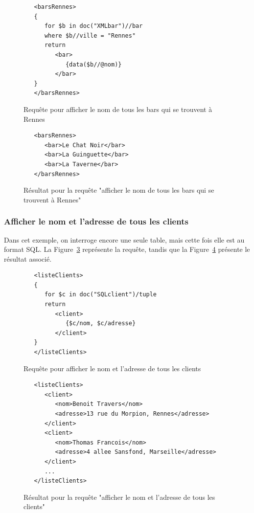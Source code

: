 \documentclass[a4paper,10pt]{article}
\newcommand{\fref}[1]{Figure~\ref{#1}}
\begin{document}
\begin{figure}[ht!]
\begin{verbatim}
   <barsRennes>
   {
      for $b in doc("XMLbar")//bar
      where $b//ville = "Rennes"
      return		
         <bar>
            {data($b//@nom)}
         </bar>		
   }
   </barsRennes>
\end{verbatim}
\caption{Requête pour afficher le nom de tous les bars qui se trouvent à Rennes}
\label{lst:requeteTest1}
\end{figure}

\begin{figure}[ht!]
\begin{verbatim}
   <barsRennes>
      <bar>Le Chat Noir</bar>
      <bar>La Guinguette</bar>
      <bar>La Taverne</bar>
   </barsRennes>
\end{verbatim}
\caption{Résultat pour la requête "afficher le nom de tous les bars qui se trouvent à Rennes"}
\label{lst:resultatTest1}
\end{figure}


\FloatBarrier
\subsubsection{Afficher le nom et l'adresse de tous les clients}

Dans cet exemple, on interroge encore une seule table, mais cette fois elle est au format SQL. La \fref{lst:requeteTest2} représente la requête, tandis que la \fref{lst:resultatTest2} présente le résultat associé.

\begin{figure}[ht!]
\begin{verbatim}
   <listeClients>
   {
      for $c in doc("SQLclient")/tuple
      return		
         <client>
            {$c/nom, $c/adresse}
         </client>		
   }
   </listeClients>
\end{verbatim}
\caption{Requête pour afficher le nom et l'adresse de tous les clients}
\label{lst:requeteTest2}
\end{figure}

\begin{figure}[ht!]
\begin{verbatim}
   <listeClients>
      <client>
         <nom>Benoit Travers</nom>
         <adresse>13 rue du Morpion, Rennes</adresse>
      </client>
      <client>
         <nom>Thomas Francois</nom>
         <adresse>4 allee Sansfond, Marseille</adresse>
      </client>
      ...
   </listeClients>
\end{verbatim}
\caption{Résultat pour la requête "afficher le nom et l'adresse de tous les clients"}
\label{lst:resultatTest2}
\end{figure}
\end{document}

